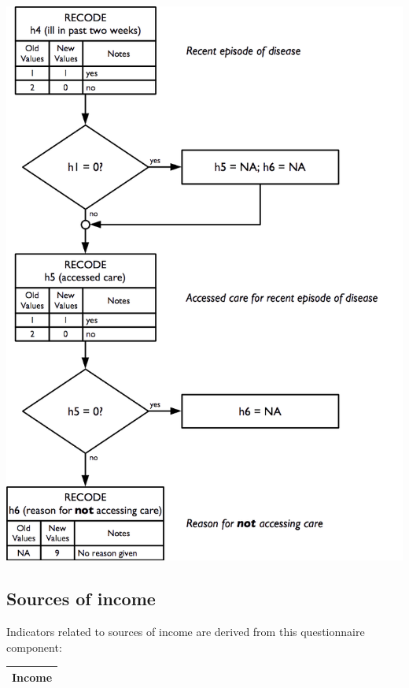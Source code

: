\documentclass[12pt,a4paper]{book}
\theoremstyle{definition}
\theoremstyle{definition}
\theoremstyle{definition}
\theoremstyle{remark}
\begin{document}
\begin{center}\includegraphics{figures/indicators22} \end{center}

\hypertarget{sources-of-income}{%
\subsection{Sources of income}\label{sources-of-income}}

Indicators related to sources of income are derived from this
questionnaire component:

\begin{longtable}[]{@{}c@{}}
\toprule
\begin{minipage}[t]{0.97\columnwidth}\centering
\textbf{Income}\strut
\end{minipage}\tabularnewline
\bottomrule
\end{longtable}
\end{document}

